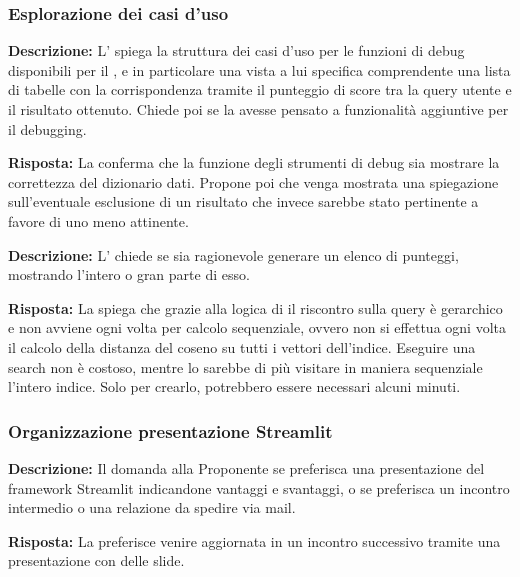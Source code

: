 \subsubsection{Esplorazione dei casi d'uso}

\textbf{Descrizione:} L' spiega la struttura dei casi d'uso per le funzioni di debug disponibili per il , e in particolare una vista a lui specifica comprendente una lista di tabelle con la corrispondenza tramite il punteggio di score tra la query utente e il risultato ottenuto. 
Chiede poi se la  avesse pensato a funzionalità aggiuntive per il debugging.

\textbf{Risposta: }La  conferma che la funzione degli strumenti di debug sia mostrare la correttezza del dizionario dati. 
Propone poi che venga mostrata una spiegazione sull'eventuale esclusione di un risultato che invece sarebbe stato pertinente a favore di uno meno attinente.

\textbf{Descrizione:} L' chiede se sia ragionevole generare un elenco di punteggi, mostrando l'intero  o gran parte di esso.

\textbf{Risposta: }La  spiega che grazie alla logica di  il riscontro sulla query è gerarchico e non avviene ogni volta per calcolo sequenziale, ovvero non si effettua ogni volta il calcolo della distanza del coseno su tutti i vettori dell'indice. 
Eseguire una search non è costoso, mentre lo sarebbe di più visitare in maniera sequenziale l'intero indice. 
Solo per crearlo, potrebbero essere necessari alcuni minuti.

\subsubsection{Organizzazione presentazione Streamlit}

\textbf{Descrizione:} Il  domanda alla Proponente se preferisca una presentazione del framework Streamlit indicandone vantaggi e svantaggi, o se preferisca un incontro intermedio o una relazione da spedire via mail.

\textbf{Risposta: }La  preferisce venire aggiornata in un incontro successivo tramite una presentazione con delle slide.